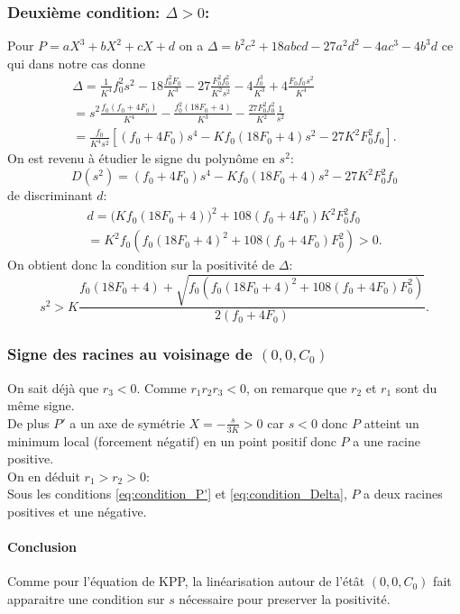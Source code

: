 \documentclass[11pt]{article}
\begin{document}
\subsubsection{Deuxième condition: $\Delta>0$:}
Pour $P=aX^3 +bX^2 + cX + d$ on a $\Delta= b^2c^2 +18abcd-27a^2d^2 -4ac^3 -4b^3d$ ce qui dans notre cas donne
\begin{align*}
	\Delta=\frac{1}{K^4}f_0^2s^2 -18 \frac{f_0^2F_0}{K^3}-27 \frac{F_0^2 f_0^2}{K^2s^2} - 4 \frac{f_0^3}{K^3}+4 \frac{F_0f_0s^2}{K^4} \\ = s^2 \frac{f_0(f_0+4F_0)}{K^4}- \frac{f_0^2(18F_0+4)}{K^3} -\frac{27F_0^2f_0^2}{K^2} \frac{1}{s^2}\\ 
=	\frac{f_0}{K^4s^2}[(f_0+4F_0)s^4-Kf_0(18F_0+4) s^2 - 27 K^2F_0^2f_0]. \end{align*}
On est revenu à étudier le signe du polynôme en $s^2$: \begin{equation}
	D(s^2)=(f_0+4F_0)s^4-Kf_0(18F_0+4)s^2 - 27 K^2F_0^2f_0
\end{equation} 
de discriminant $d$:
\begin{align*}
	d=\Big(Kf_0(18F_0+4) \Big)^2 +108(f_0+4F_0)K^2F_0^2f_0 \\ 
	= K^2f_0(f_0(18F_0+4)^2+108(f_0+4F_0)F_0^2) >0.
\end{align*}
On obtient donc la condition sur la positivité de $\Delta$: 
\begin{equation}\boxed{
	s^2> K\frac{f_0(18F_0+4)+\sqrt{f_0(f_0(18F_0+4)^2+108(f_0+4F_0)F_0^2)}}{2(f_0+4F_0)}.
	}\label{eq:condition_Delta}
\end{equation}
\subsubsection{Signe des racines au voisinage de $(0,0,C_0)$}
On sait déjà que $r_3<0$. Comme $r_1r_2r_3<0$, on remarque que $r_2$ et $r_1$ sont du même signe.\\
De plus $P'$ a un axe de symétrie $X=-\frac{s}{3K}>0$ car $s<0$ donc $P$ atteint un minimum local (forcement négatif) en un point positif donc $P$ a une racine positive.\\
On en déduit $r_1>r_2>0$: \\ 
Sous les conditions \eqref{eq:condition_P'} et \eqref{eq:condition_Delta}, $P$ a deux racines positives et une négative.

\paragraph{Conclusion}
Comme pour l'équation de KPP, la linéarisation autour de l'étât $(0,0,C_0)$ fait apparaitre une condition sur $s$ nécessaire pour preserver la positivité.
\end{document}
